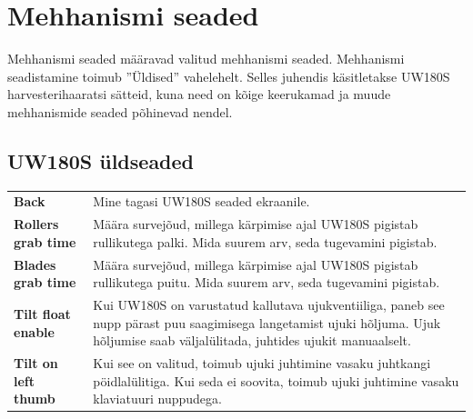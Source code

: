 \documentclass[12pt,a4paper,english]{uvmanual}
\begin{document}


\section{Mehhanismi seaded}\label{ch:settings_implement}

Mehhanismi seaded määravad valitud mehhanismi seaded. Mehhanismi seadistamine toimub ''Üldised'' vahelehelt. Selles juhendis käsitletakse UW180S harvesterihaaratsi sätteid, kuna need on kõige keerukamad ja muude mehhanismide seaded põhinevad nendel.



\FloatBarrier
\subsection{UW180S üldseaded}\label{ch:settings_uw180s_meas}


\begin{tabular}{ L{0.2\textwidth} L{0.66\textwidth} }
\textbf{Back} & Mine tagasi UW180S seaded ekraanile.  \\
\textbf{Rollers grab time} & Määra survejõud, millega kärpimise ajal UW180S pigistab rullikutega palki. Mida suurem arv, seda tugevamini pigistab.  \\
\textbf{Blades grab time} & Määra survejõud, millega kärpimise ajal UW180S pigistab rullikutega puitu. Mida suurem arv, seda tugevamini pigistab.  \\
\textbf{Tilt float enable} & Kui UW180S on varustatud kallutava ujukventiiliga, paneb see nupp pärast puu saagimisega langetamist ujuki hõljuma. Ujuk hõljumise saab väljalülitada, juhtides ujukit manuaalselt.  \\
\textbf{Tilt on left thumb} & Kui see on valitud, toimub ujuki juhtimine vasaku juhtkangi pöidlalülitiga. Kui seda ei soovita, toimub ujuki juhtimine vasaku klaviatuuri nuppudega.  \\
\end{tabular}
\end{document}
